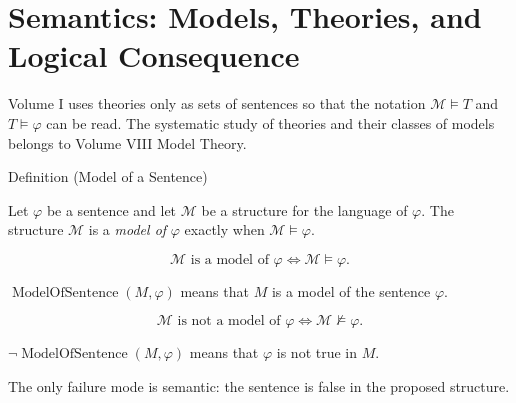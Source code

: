 
\section{Semantics: Models, Theories, and Logical Consequence}

\begin{remark*}
Volume I uses theories only as sets of sentences so that the notation
\(\mathcal M\models T\) and \(T\models\varphi\) can be read. The systematic
study of theories and their classes of models belongs to Volume VIII Model
Theory.
\end{remark*}

\begin{definitionbox}{Definition (Model of a Sentence)}
\begin{definition}
\label{def:model}
Let \(\varphi\) be a sentence and let \(\mathcal M\) be a structure for the
language of \(\varphi\). The structure \(\mathcal M\) is a \emph{model of}
\(\varphi\) exactly when \(\mathcal M\models\varphi\).
\end{definition}
\end{definitionbox}

\begin{remark*}
\[
\mathcal M \text{ is a model of } \varphi
\Longleftrightarrow
\mathcal M\models\varphi.
\]
\end{remark*}

\begin{remark*}
\(\operatorname{ModelOfSentence}(M,\varphi)\) means that \(M\) is a model of
the sentence \(\varphi\).
\end{remark*}

\begin{remark*}
\[
\mathcal M \text{ is not a model of } \varphi
\Longleftrightarrow
\mathcal M\not\models\varphi.
\]
\end{remark*}

\begin{remark*}
\(\neg\operatorname{ModelOfSentence}(M,\varphi)\) means that \(\varphi\) is not
true in \(M\).
\end{remark*}

\begin{remark*}
The only failure mode is semantic: the sentence is false in the proposed
structure.
\end{remark*}

